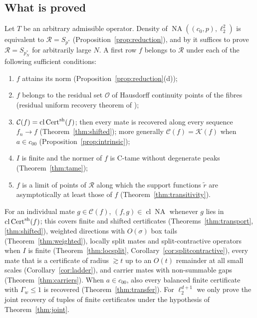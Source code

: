 \documentclass[10pt]{amsart}
\theoremstyle{definition}
\theoremstyle{remark}
\newcommand{\NA}{\operatorname{NA}}
\newcommand{\Cset}{\mathcal C}
\newcommand{\Cert}{\operatorname{Cert}}
\newcommand{\cl}{\operatorname{cl}}
\newcommand{\Rec}{\mathcal R}
\begin{document}
\subsection{What is proved}
Let $T$ be an arbitrary admissible operator.  Density of
$\NA((c_0,p),\ell_2^2)$ is equivalent to $\Rec=S_{p^*}$
(Proposition~\ref{prop:reduction}), and by \cite[Remark~6.9]{PrB} it
suffices to prove $\Rec=S_{p_N^*}$ for arbitrarily large $N$.  A first row
$f$ belongs to $\Rec$ under each of the following sufficient conditions:
\begin{enumerate}
\item[(S1)] $f$ attains its norm (Proposition~\ref{prop:reduction}(d));
\item[(S2)] $f$ belongs to the residual set $\mathcal O$ of Hausdorff continuity
points of the fibres (residual uniform recovery theorem of \cite{PrA});
\item[(S3)] $\Cset(f)=\cl\Cert^{\rm sh}(f)$; then every mate is recovered
along every sequence $f_n\to f$ (Theorem~\ref{thm:shifted}); more generally
$\Cset(f)=\mathcal K(f)$ when $a\in c_{00}$ (Proposition~\ref{prop:intrinsic});
\item[(S4)] $I$ is finite and the normer of $f$ is C-tame without
degenerate peaks (Theorem~\ref{thm:tame});
\item[(S5)] $f$ is a limit of points of $\Rec$ along which the support
functions $\tilde r$ are asymptotically at least those of $f$
(Theorem~\ref{thm:transitivity}).
\end{enumerate}
For an individual mate $g\in\Cset(f)$, $(f,g)\in\cl\NA$ whenever $g$ lies
in $\cl\Cert^{\rm sh}(f)$; this covers finite and shifted certificates
(Theorems~\ref{thm:transport}, \ref{thm:shifted}), weighted directions with
$O(\sigma)$ box tails (Theorem~\ref{thm:weighted}), locally split mates and
split-contractive operators when $I$ is finite (Theorem~\ref{thm:locsplit},
Corollary~\ref{cor:splitcontractive}), every mate that is a certificate of
radius $\gtrsim t$ up to an $O(t)$ remainder at all small scales
(Corollary~\ref{cor:ladder}), and carrier mates with non-summable gaps
(Theorem~\ref{thm:carriers}).  When $a\in c_{00}$, also every balanced
finite certificate with $\Gamma_w\le1$ is recovered
(Theorem~\ref{thm:transfer}).  For $\ell_2^{d+1}$ we only prove the joint
recovery of tuples of finite certificates under the hypothesis of
Theorem~\ref{thm:joint}.
\end{document}
